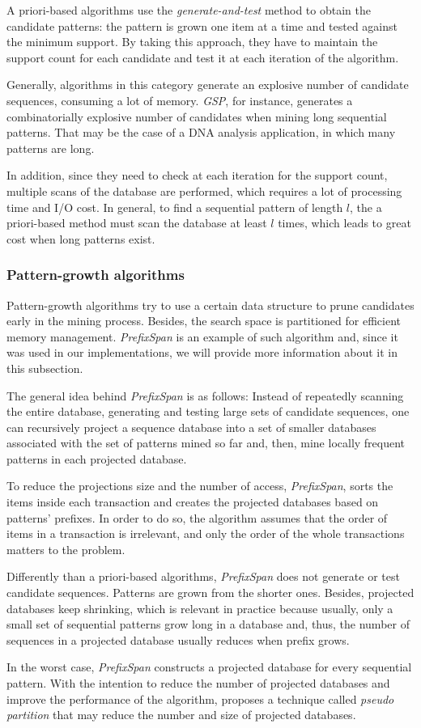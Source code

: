 A priori-based algorithms use the \textit{generate-and-test} method to obtain the candidate patterns: the pattern is grown one item at a time and tested against the minimum support. By taking this approach, they have to maintain the support count for each candidate and test it at each iteration of the algorithm.

Generally, algorithms in this category generate an explosive number of candidate sequences, consuming a lot of memory. \textit{GSP}, for instance, generates a combinatorially explosive number of candidates when mining long sequential patterns. That may be the case of a DNA analysis application, in which many patterns are long.

In addition, since they need to check at each iteration for the support count, multiple scans of the database are performed, which requires a lot of processing time and I/O cost. In general, to find a sequential pattern of length $l$, the a priori-based method must scan the database at least $l$ times, which leads to great cost when long patterns exist.

\subsubsection{Pattern-growth algorithms}

Pattern-growth algorithms try to use a certain data structure to prune candidates early in the mining process. Besides, the search space is partitioned for efficient memory management. \textit{PrefixSpan}\cite{Pei} is an example of such algorithm and, since it was used in our implementations, we will provide more information about it in this subsection.

The general idea behind \textit{PrefixSpan} is as follows: Instead of repeatedly scanning the entire database, generating and testing large sets of candidate sequences, one can recursively project a sequence database into a set of smaller databases associated with the set of patterns mined so far and, then, mine locally frequent patterns in each projected database\cite{Pei}.

To reduce the projections size and the number of access, \textit{PrefixSpan}, sorts the items inside each transaction and creates the projected databases based on patterns' prefixes. In order to do so, the algorithm assumes that the order of items in a transaction is irrelevant, and only the order of the whole transactions matters to the problem.

Differently than a priori-based algorithms, \textit{PrefixSpan} does not generate or test candidate sequences. Patterns are grown from the shorter ones. Besides, projected databases keep shrinking, which is relevant in practice because usually, only a small set of sequential patterns grow long in a database and, thus, the number of sequences in a projected database usually reduces when prefix grows.

In the worst case, \textit{PrefixSpan} constructs a projected database for every sequential pattern. With the intention to reduce the number of projected databases and improve the performance of the algorithm, \cite{Pei} proposes a technique called \textit{pseudo partition} that may reduce the number and size of projected databases.

